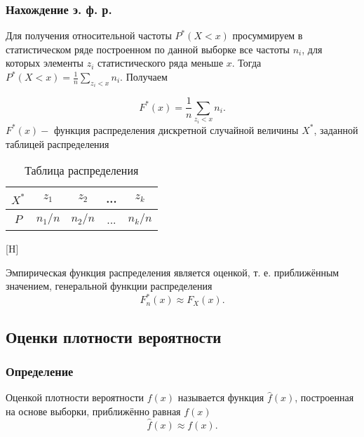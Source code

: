 \documentclass[main.tex]{subfiles}
\begin{document}
    \subsubsection{Нахождение э. ф. р.}
    \noindent Для получения относительной частоты $P^*(X < x)$ просуммируем в статистическом ряде построенном по данной выборке все частоты $n_i$, для которых элементы $z_i$ статистического ряда меньше $x$. Тогда $P^*(X < x) = \frac{1}{n}\sum_{z_i<x}n_i$. Получаем   

    \begin{equation} \label{empiricalFunc:EFD}
    	F^*(x)=\frac{1}{n}\sum_{z_i<x}n_i.
    \end{equation}
        $F^*(x)-$ функция распределения дискретной случайной величины $X^*$, заданной таблицей распределения
    \begin{table}[H]
	    \centering
	\begin{tabular}{|c|c|c|c|c|}
	    	\hline
	    	$X^*$&$z_1$&$z_2$&...&$z_k$\\
	    	\hline
	    	$P$&$n_1/n$&$n_2/n$&...&$n_k/n$\\
	    	\hline
	    \end{tabular}
    	\caption{Таблица распределения}
    	\label{tab:my_label}
    \end{table}[H]
    
    \noindent Эмпирическая функция распределения является оценкой, т. е. приближённым значением, генеральной функции распределения
    \begin{equation} \label{empiricalFunc:approx}
    	F_n^*(x)\approx F_X(x).
    \end{equation}


    \subsection{Оценки плотности вероятности}
    \subsubsection{Определение}
    \noindent Оценкой плотности вероятности $f(x)$ называется функция $\widehat{f}(x)$, построенная на основе выборки, приближённо равная $f(x)$
    \begin{equation} \label{densityEstim}
    	\widehat{f}(x)\approx f(x).
    \end{equation}
\end{document}

